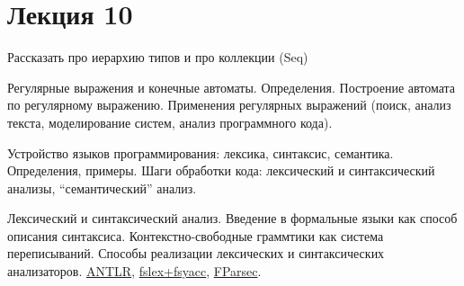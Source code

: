 \section{Лекция 10}

    	Рассказать про иерархию типов и про коллекции (Seq)

    Регулярные выражения и конечные автоматы. Определения. Построение автомата по регулярному выражению. Применения регулярных выражений (поиск, анализ текста, моделирование систем, анализ программного кода).

    Устройство языков программирования: лексика, синтаксис, семантика. Определения, примеры. Шаги обработки кода: лексический и синтаксический анализы, ``семантический'' анализ.
    
    Лексический и синтаксический анализ. Введение в формальные языки как способ описания синтаксиса. Контекстно-свободные граммтики как система переписываний. 
    Способы реализации лексических и синтаксических анализаторов. \href{https://www.antlr.org/}{ANTLR}, \href{https://fsprojects.github.io/FsLexYacc/}{fslex+fsyacc}, \href{https://www.quanttec.com/fparsec/about/}{FParsec}.
